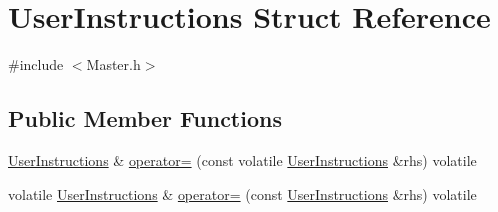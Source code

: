 \hypertarget{struct_user_instructions}{}\section{User\+Instructions Struct Reference}
\label{struct_user_instructions}


{\ttfamily \#include $<$Master.\+h$>$}

\subsection*{Public Member Functions}
\begin{DoxyCompactItemize}
\item 
\mbox{\hyperlink{struct_user_instructions}{User\+Instructions}} \& \mbox{\hyperlink{struct_user_instructions_a5fe93c82cf239bddd972595fe71a2196}{operator=}} (const volatile \mbox{\hyperlink{struct_user_instructions}{User\+Instructions}} \&rhs) volatile
\item 
volatile \mbox{\hyperlink{struct_user_instructions}{User\+Instructions}} \& \mbox{\hyperlink{struct_user_instructions_a70e5ef4407c43d8e574dfe4b46083d56}{operator=}} (const \mbox{\hyperlink{struct_user_instructions}{User\+Instructions}} \&rhs) volatile
\end{DoxyCompactItemize}
